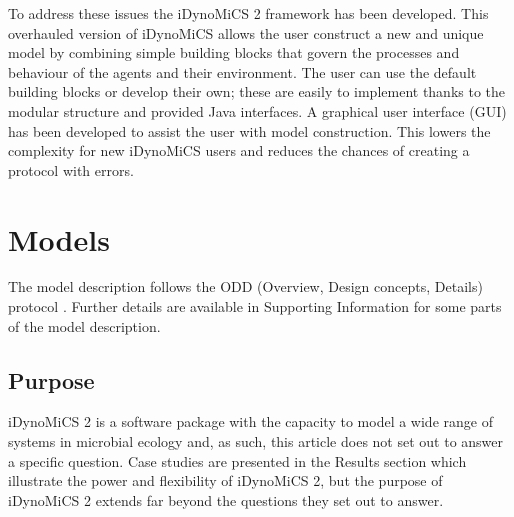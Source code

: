 \documentclass[10pt,letterpaper]{article}
\begin{document}
To address these issues the iDynoMiCS 2 framework has been developed. This overhauled version of iDynoMiCS allows the user construct a new and unique model by combining simple building blocks that govern the processes and behaviour of the agents and their environment. The user can use the default building blocks or develop their own; these are easily to implement thanks to the modular structure and provided Java interfaces. A graphical user interface (GUI) has been developed to assist the user with model construction. This lowers the complexity for new iDynoMiCS users and reduces the chances of creating a protocol with errors.


\section*{Models}
The model description follows the ODD (Overview, Design concepts, Details) protocol \cite{Grimm2006, Grimm2010}. Further details are available in Supporting Information for some parts of the model description.

\subsection*{Purpose}
iDynoMiCS 2 is a software package with the capacity to model a wide range of systems in microbial ecology and, as such, this article does not set out to answer a specific question. Case studies are presented in the Results section which illustrate the power and flexibility of iDynoMiCS 2, but the purpose of iDynoMiCS 2 extends far beyond the questions they set out to answer.
\end{document}
